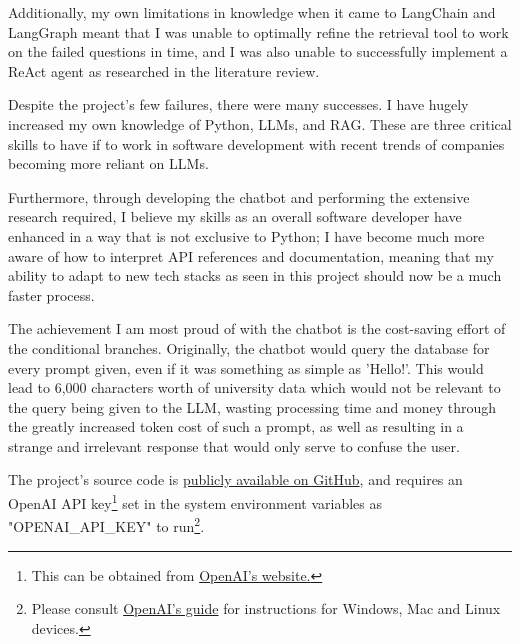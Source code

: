 \para Additionally, my own limitations in knowledge when it came to LangChain and LangGraph meant that I was unable to optimally refine the 
retrieval tool to work on the failed questions in time, and I was also unable to successfully implement a ReAct agent as researched in the 
literature review.

\para Despite the project's few failures, there were many successes. I have hugely increased my own knowledge of Python, LLMs,
and RAG. These are three critical skills to have if to work in software development with recent trends of companies 
becoming more reliant on LLMs. 

\para Furthermore, through developing the chatbot and performing the extensive research required, I believe my skills as an overall software 
developer have enhanced in a way that is not exclusive to Python; I have become much more aware of how to interpret API references and documentation,
meaning that my ability to adapt to new tech stacks as seen in this project should now be a much faster process.

\para The achievement I am most proud of with the chatbot is the cost-saving effort of the conditional branches. Originally, the chatbot would 
query the database for every prompt given, even if it was something as simple as 'Hello!'. This would lead to 6,000 characters worth of university
data which would not be relevant to the query being given to the LLM, wasting processing time and money through the greatly increased token cost 
of such a prompt, as well as resulting in a strange and irrelevant response that would only serve to confuse the user. 

\para The project's source code is \href{https://github.com/LewGoesB00M/CMP6200/tree/main}{publicly available on GitHub}, and requires an OpenAI 
API key\footnote{This can be obtained from \href{https://platform.openai.com/settings/organization/api-keys}{OpenAI's website.}} set in the system environment variables as "OPENAI\_API\_KEY" to run\footnote{Please consult \href{https://help.openai.com/en/articles/5112595-best-practices-for-api-key-safety}{OpenAI's guide} for instructions for Windows, Mac and Linux devices.}. 